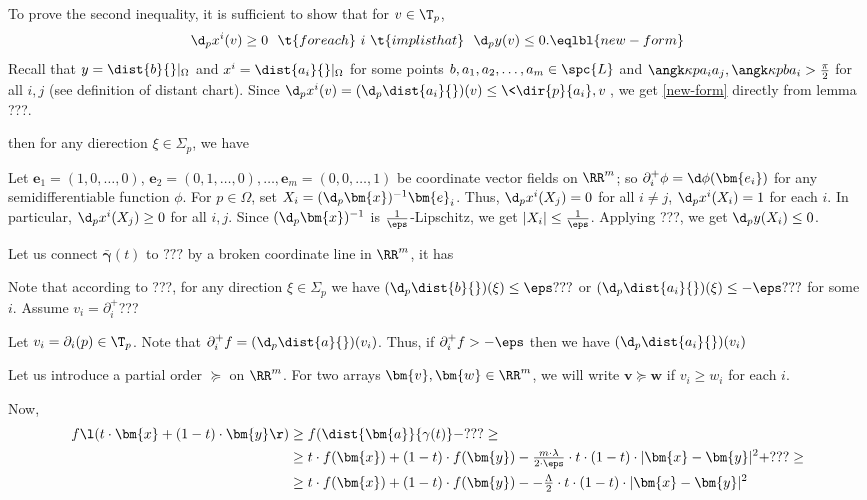 {To prove the second inequality, 
it is sufficient to show that for $v\in\T_p$,
$$\d_p x^i(v)\ge 0
\ \ 
\t{for each}
\ i\ 
\t{implis that}
\ \ \d_p y(v)\le 0.\eqlbl{new-form}$$
Recall that $y=\dist{b}{}|_\Omega$ and $x^i=\dist{a_i}{}|_\Omega$  for some points $b,a_1,a_2,\dots,a_m\in \spc{L}$  and $\angk\kappa{p}{a_i}{a_j},\angk\kappa{p}{b}{a_i}>\tfrac\pi2$ for all $i,j$ (see definition of distant chart).
Since $\d_p x^i(v)=(\d_p\dist{a_i}{})(v)\le\<\dir{p}{a_i},v\>$, we get \ref{new-form} directly from lemma ???.

then for any dierection $\xi\in\Sigma_p$, we have 

Let $\bm{e}_1=(1,0,\dots,0)$, $\bm{e}_2=(0,1,\dots,0),\dots,\bm{e}_m=(0,0,\dots,1)$ be coordinate vector fields on $\RR^m$;
so $\partial^+_i\phi=\d\phi(\bm{e_i})$ for any semidifferentiable function $\phi$.
For $p\in\Omega$, set $X_i=(\d_p\bm{x})^{-1}\bm{e}_i$.
Thus, $\d_px^i(X_j)=0$ for all $i\not=j$,
$\d_px^i(X_i)=1$ for each $i$. 
In particular, $\d_px^i(X_j)\ge 0$ for all $i,j$.
Since $(\d_p\bm{x})^{-1}$ is $\tfrac{1}{\eps}$-Lipschitz, we get $|X_i|\le \tfrac1\eps$.
Applying ???, we get $\d_p y(X_i)\le 0$.

Let us connect $\bm{\bar\gamma}(t)$ to $???$ by a broken coordinate line in $\RR^m$,
it has 

Note that according to ???, for any direction $\xi\in\Sigma_p$ we have
$(\d_p\dist{b}{})(\xi)\le \eps???$
or $(\d_p\dist{a_i}{})(\xi)\le -\eps???$ for some $i$.
Assume $v_i=\partial^+_i$???

Let $v_i=\partial_i(p)\in \T_p$.
Note that $\partial_i^+f=(\d_p\dist{a}{})(v_i)$.
Thus, if $\partial_i^+f>-\eps$ then we have
$(\d_p\dist{a_i}{})(v_i)$

























Let us introduce a partial order $\succcurlyeq$ on $\RR^{m}$.
For two arrays 
$\bm{v}, \bm{w}\in \RR^{m}$, 
we will write
$\bm{v}\succcurlyeq\bm{w}$ if $v_i\ge w_i$ for each $i$.

Now,
\begin{align*}
 f\l(t\cdot\bm{x}+(1-t)\cdot\bm{y}\r)
&\ge
f(\dist{\bm{a}}{\gamma(t)}-???
\ge
\\
&\ge
t\cdot f(\bm{x})
+(1-t)\cdot f(\bm{y})
-\tfrac{m\cdot\lambda}{2\cdot\eps}\cdot t\cdot(1-t)\cdot|\bm{x}-\bm{y}|^2+???
\ge
\\
&\ge
t\cdot f(\bm{x})
+(1-t)\cdot f(\bm{y})-
-\tfrac\Lambda2\cdot t\cdot(1-t)\cdot|\bm{x}-\bm{y}|^2
\end{align*}


}
